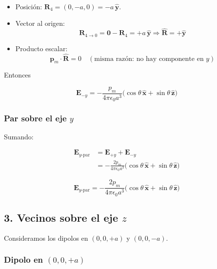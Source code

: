 \documentclass{article}
\begin{document}
\begin{itemize}
  \item Posición: $\mathbf{R}_{4} = (0,-a,0) = -a\,\hat{\mathbf{y}}$.
  \item Vector al origen:
    \[
    \mathbf{R}_{4\to 0} = \mathbf{0} - \mathbf{R}_{4}
    = +a\,\hat{\mathbf{y}}
    \Rightarrow \hat{\mathbf{R}} = +\hat{\mathbf{y}}
    \]
  \item Producto escalar:
    \[
    \mathbf{p}_{m}\cdot\hat{\mathbf{R}} = 0
    \quad (\text{misma razón: no hay componente en }y)
    \]
\end{itemize}

Entonces

\begin{equation}
\boxed{
\mathbf{E}_{-y}
= -\frac{p_{m}}{4\pi\epsilon_{0}a^{3}}
  \bigl(\cos\theta\,\hat{\mathbf{x}} + \sin\theta\,\hat{\mathbf{z}}\bigr)
}
\label{eq:Ey-menos}
\end{equation}

\subsubsection*{Par sobre el eje $y$}

Sumando:

\begin{align}
\mathbf{E}_{y\text{-par}}
&= \mathbf{E}_{+y} + \mathbf{E}_{-y}\\[4pt]
&= -\frac{2p_{m}}{4\pi\epsilon_{0}a^{3}}
   \bigl(\cos\theta\,\hat{\mathbf{x}} + \sin\theta\,\hat{\mathbf{z}}\bigr)
\end{align}

\begin{equation}
\boxed{
\mathbf{E}_{y\text{-par}}
= -\frac{2p_{m}}{4\pi\epsilon_{0}a^{3}}
  \bigl(\cos\theta\,\hat{\mathbf{x}} + \sin\theta\,\hat{\mathbf{z}}\bigr)
}
\label{eq:Ey-par}
\end{equation}

\subsection*{3. Vecinos sobre el eje $z$}

Consideramos los dipolos en $(0,0,+a)$ y $(0,0,-a)$.

\subsubsection*{Dipolo en $(0,0,+a)$}
\end{document}

